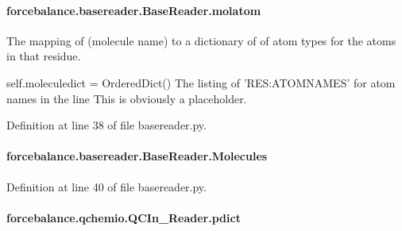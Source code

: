 \hypertarget{classforcebalance_1_1basereader_1_1BaseReader_a56e6e6024825ada94ab24f5f3ce59851}{
\paragraph[{molatom}]{\setlength{\rightskip}{0pt plus 5cm}forcebalance.\-basereader.\-Base\-Reader.\-molatom\hspace{0.3cm}{\ttfamily [inherited]}}}\label{classforcebalance_1_1basereader_1_1BaseReader_a56e6e6024825ada94ab24f5f3ce59851}


The mapping of (molecule name) to a dictionary of of atom types for the atoms in that residue. 

self.\-moleculedict = Ordered\-Dict() The listing of 'R\-E\-S\-:A\-T\-O\-M\-N\-A\-M\-E\-S' for atom names in the line This is obviously a placeholder. 

Definition at line 38 of file basereader.\-py.

\hypertarget{classforcebalance_1_1basereader_1_1BaseReader_ad2842550aa690f1cd82e41ec8d6fe541}{
\paragraph[{Molecules}]{\setlength{\rightskip}{0pt plus 5cm}forcebalance.\-basereader.\-Base\-Reader.\-Molecules\hspace{0.3cm}{\ttfamily [inherited]}}}\label{classforcebalance_1_1basereader_1_1BaseReader_ad2842550aa690f1cd82e41ec8d6fe541}


Definition at line 40 of file basereader.\-py.

\hypertarget{classforcebalance_1_1qchemio_1_1QCIn__Reader_a8164f42ffde838198f885a133c367941}{
\paragraph[{pdict}]{\setlength{\rightskip}{0pt plus 5cm}forcebalance.\-qchemio.\-Q\-C\-In\-\_\-\-Reader.\-pdict}}\label{classforcebalance_1_1qchemio_1_1QCIn__Reader_a8164f42ffde838198f885a133c367941}


